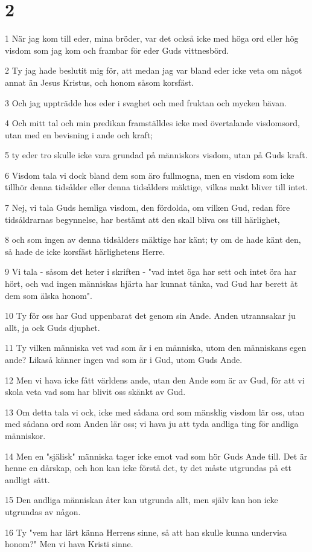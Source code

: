 \chapter{2}

\par 1 När jag kom till eder, mina bröder, var det också icke med höga ord eller hög visdom som jag kom och frambar för eder Guds vittnesbörd.
\par 2 Ty jag hade beslutit mig för, att medan jag var bland eder icke veta om något annat än Jesus Kristus, och honom såsom korsfäst.
\par 3 Och jag uppträdde hos eder i svaghet och med fruktan och mycken bävan.
\par 4 Och mitt tal och min predikan framställdes icke med övertalande visdomsord, utan med en bevisning i ande och kraft;
\par 5 ty eder tro skulle icke vara grundad på människors visdom, utan på Guds kraft.
\par 6 Visdom tala vi dock bland dem som äro fullmogna, men en visdom som icke tillhör denna tidsålder eller denna tidsålders mäktige, vilkas makt bliver till intet.
\par 7 Nej, vi tala Guds hemliga visdom, den fördolda, om vilken Gud, redan före tidsåldrarnas begynnelse, har bestämt att den skall bliva oss till härlighet,
\par 8 och som ingen av denna tidsålders mäktige har känt; ty om de hade känt den, så hade de icke korsfäst härlighetens Herre.
\par 9 Vi tala - såsom det heter i skriften - "vad intet öga har sett och intet öra har hört, och vad ingen människas hjärta har kunnat tänka, vad Gud har berett åt dem som älska honom".
\par 10 Ty för oss har Gud uppenbarat det genom sin Ande. Anden utrannsakar ju allt, ja ock Guds djuphet.
\par 11 Ty vilken människa vet vad som är i en människa, utom den människans egen ande? Likaså känner ingen vad som är i Gud, utom Guds Ande.
\par 12 Men vi hava icke fått världens ande, utan den Ande som är av Gud, för att vi skola veta vad som har blivit oss skänkt av Gud.
\par 13 Om detta tala vi ock, icke med sådana ord som mänsklig visdom lär oss, utan med sådana ord som Anden lär oss; vi hava ju att tyda andliga ting för andliga människor.
\par 14 Men en "själisk" människa tager icke emot vad som hör Guds Ande till. Det är henne en dårskap, och hon kan icke förstå det, ty det måste utgrundas på ett andligt sätt.
\par 15 Den andliga människan åter kan utgrunda allt, men själv kan hon icke utgrundas av någon.
\par 16 Ty "vem har lärt känna Herrens sinne, så att han skulle kunna undervisa honom?" Men vi hava Kristi sinne.

